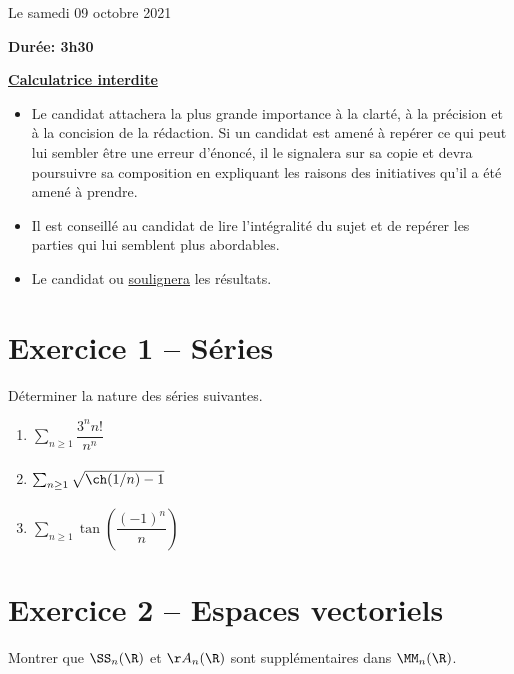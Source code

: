 \documentclass[twoside,french,11pt]{VcCours}
\begin{document}

\begin{center}
\large 
Le samedi 09 octobre 2021

\bigskip
\textbf{Durée: 3h30}

\bigskip
\large\underline{\textbf{Calculatrice interdite}}
\end{center}

\bigskip
\begin{itemize}
  \item Le candidat attachera la plus grande importance à la clarté, à la précision et à la concision de la rédaction. Si un candidat est amené à repérer ce qui peut lui sembler être une erreur d'énoncé, il le signalera sur sa copie et devra poursuivre sa composition en expliquant les raisons des initiatives qu'il a été amené à prendre.
  \item Il est conseillé au candidat de lire l'intégralité du sujet et de repérer les parties qui lui semblent plus abordables.
  \item Le candidat  ou \underline{soulignera} les résultats. 
  \end{itemize}
\separationTitre


\section*{Exercice 1 -- Séries}
  Déterminer la nature des séries suivantes. 
  
  \begin{multicols}{3}
  \begin{enumerate}
  \item $\sum_{n \geq 1} \dfrac{3^n n!}{n^n}$
  \columnbreak
  \item $\sum_{n \geq 1} \sqrt{\ch(1/n)-1}\phantom{\dfrac{3^n n!}{n^n}}$
  \columnbreak
  \item $\sum_{n \geq 1} \tan \left( \dfrac{(-1)^n}{n}\right)$
  \end{enumerate}
  \end{multicols}

\section*{Exercice 2 -- Espaces vectoriels}
  Montrer que $\SS_n(\R)$ et $\AA_n(\R)$ sont supplémentaires dans $\MM_n(\R)$.
\end{document}
